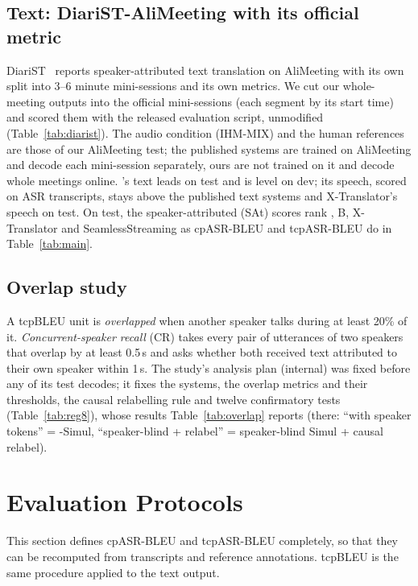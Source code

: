\subsection{Text: DiariST-AliMeeting with its official metric}
\label{app:diarist}
DiariST~\citep{yang2024diarist} reports speaker-attributed text translation on AliMeeting with its own split into 3--6
minute mini-sessions and its own metrics. We cut our whole-meeting outputs into the official mini-sessions (each
segment by its start time) and scored them with the released evaluation script, unmodified (Table~\ref{tab:diarist}).
The audio condition (IHM-MIX) and the human references are those of our AliMeeting test; the published systems are
trained on AliMeeting and decode each mini-session separately, ours are not trained on it and decode whole meetings
online. \sys{}'s text leads on test and is level on dev; its speech, scored on ASR transcripts, stays above the
published text systems and X-Translator's speech on test. On test, the speaker-attributed (SAt) scores rank \sys{}, B,
X-Translator and SeamlessStreaming as cpASR-BLEU and tcpASR-BLEU do in Table~\ref{tab:main}.


\subsection{Overlap study}
\label{app:v8}
\label{sec:eval-overlap}
A tcpBLEU unit is \emph{overlapped} when another speaker talks during at least 20\% of it. \emph{Concurrent-speaker
recall} (CR) takes every pair of utterances of two speakers that overlap by at least 0.5\,s and asks whether both
received text attributed to their own speaker within 1\,s. The study's analysis plan (internal) was fixed before any of
its test decodes; it fixes the systems, the overlap metrics and their thresholds, the causal relabelling rule and twelve
confirmatory tests (Table~\ref{tab:reg8}), whose results Table~\ref{tab:overlap} reports (there: ``with speaker
tokens'' = \sys{}-Simul, ``speaker-blind + relabel'' = speaker-blind Simul + causal relabel).



\section{Evaluation Protocols}
\label{app:eval}
\label{app:metrics}
\label{app:prereg}

This section defines cpASR-BLEU and tcpASR-BLEU completely, so that they can be recomputed from transcripts and
reference annotations. tcpBLEU is the same procedure applied to the text output.

